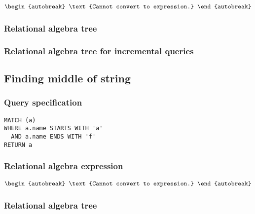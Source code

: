 \begin{align*}
\begin{autobreak}
\text{Cannot convert to expression.}
\end{autobreak}
\end{align*}

\subsubsection*{Relational algebra tree}


\subsubsection*{Relational algebra tree for incremental queries}


\subsection{Finding middle of string}

\subsubsection*{Query specification}

\begin{lstlisting}
MATCH (a)
WHERE a.name STARTS WITH 'a'
  AND a.name ENDS WITH 'f'
RETURN a
\end{lstlisting}

\subsubsection*{Relational algebra expression}

\begin{align*}
\begin{autobreak}
\text{Cannot convert to expression.}
\end{autobreak}
\end{align*}

\subsubsection*{Relational algebra tree}


